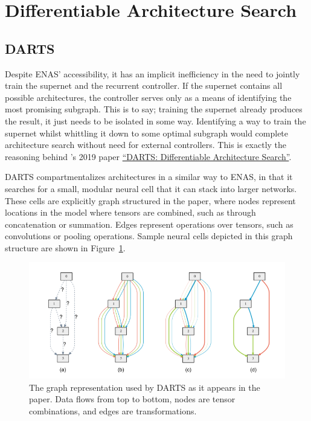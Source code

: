 \section{Differentiable Architecture Search}
\subsection{DARTS}
Despite ENAS' accessibility, it has an implicit inefficiency in the need to jointly train the supernet and the recurrent
controller. If the supernet contains all possible architectures, the controller serves only as a means of identifying
the most promising subgraph. This is to say; training the supernet already produces the result, it just needs to be
isolated in some way. Identifying a way to train the supernet whilst whittling it down to some optimal subgraph
would complete architecture search without need for external controllers. This is exactly the reasoning behind \citeauthor{liu2018}'s
2019 paper \hyperlink{cite.liu2018}{``DARTS: Differentiable Architecture Search''}.

DARTS compartmentalizes architectures in a similar way to ENAS, in that it searches for a small, modular neural cell
that it can stack into larger networks. These cells are explicitly graph structured in the paper, where nodes represent
locations in the model where tensors are combined, such as through concatenation or summation. Edges represent
operations over tensors, such as convolutions or pooling operations. Sample neural cells depicted in this
graph structure are shown in Figure~\ref{fig:darts}.

\begin{figure}
    \center
    \includegraphics{DARTS_cell}
    \caption[DARTS' graph representation]{The graph representation used by DARTS as it appears in the paper. Data flows from top to bottom, nodes are
    tensor combinations, and edges are transformations.}
    \label{fig:darts}
\end{figure}

